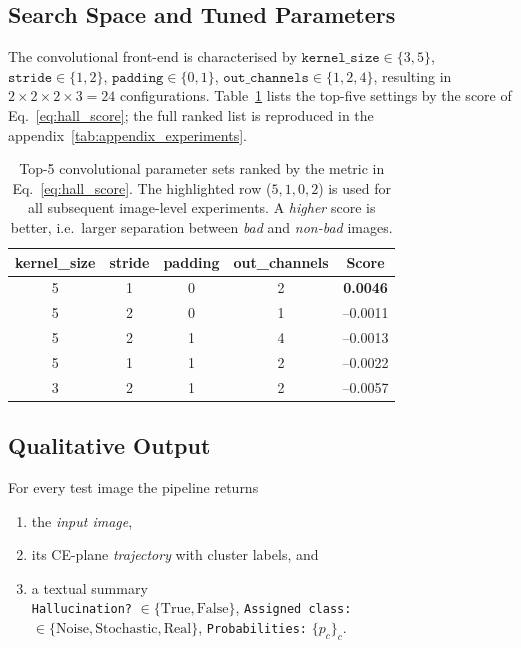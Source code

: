 \documentclass{article}
\begin{document}
\subsection{Search Space and Tuned Parameters}
The convolutional front-end is characterised by  
\(\texttt{kernel\_size}\in\{3,5\}\),  
\(\texttt{stride}\in\{1,2\}\),  
\(\texttt{padding}\in\{0,1\}\),  
\(\texttt{out\_channels}\in\{1,2,4\}\),
resulting in \(2\times2\times2\times3=24\) configurations.
Table~\ref{tab:image_grid} lists the top-five settings by the score of
Eq.~\eqref{eq:hall_score}; the full ranked list is reproduced in the
appendix~\ref{tab:appendix_experiments}.

\begin{table}[h!]
\centering
\begin{tabular}{@{}ccccc@{}}
\toprule
kernel\_size & stride & padding & out\_channels & Score \\
\midrule
\rowcolor[HTML]{E0E0FF} 5 & 1 & 0 & 2 & \textbf{0.0046} \\
5 & 2 & 0 & 1 & --0.0011 \\
5 & 2 & 1 & 4 & --0.0013 \\
5 & 1 & 1 & 2 & --0.0022 \\
3 & 2 & 1 & 2 & --0.0057 \\
\bottomrule
\end{tabular}
\caption{Top-5 convolutional parameter sets ranked by the metric in
Eq.~\eqref{eq:hall_score}.  The highlighted row (\(5,1,0,2\)) is used
for all subsequent image-level experiments.  A \emph{higher} score is
better, i.e.\ larger separation between \emph{bad} and
\emph{non-bad} images.}
\label{tab:image_grid}
\end{table}

\subsection{Qualitative Output}
For every test image the pipeline returns

\begin{enumerate}
\item the \emph{input image},
\item its CE-plane \emph{trajectory} with cluster labels, and
\item a textual summary
\smallskip\\
\verb|Hallucination?| \(\in\{\text{True},\text{False}\}\),\;
\verb|Assigned class:| \(\in\{\text{Noise},
\text{Stochastic},\text{Real}\}\),\;
\verb|Probabilities:| \(\{p_c\}_c\).
\end{enumerate}
\end{document}
